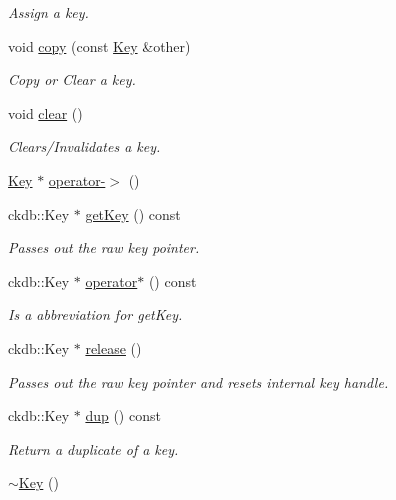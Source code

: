 \begin{DoxyCompactItemize}
\begin{DoxyCompactList}\small\item\em Assign a key. \end{DoxyCompactList}\item 
void \hyperlink{classkdb_1_1Key_ab5bc93e22f4cf40b9d2b1fc32cc260be}{copy} (const \hyperlink{classkdb_1_1Key}{Key} \&other)
\begin{DoxyCompactList}\small\item\em Copy or Clear a key. \end{DoxyCompactList}\item 
void \hyperlink{classkdb_1_1Key_a33a112681b0b2e94e6d369c0f89e361b}{clear} ()
\begin{DoxyCompactList}\small\item\em Clears/\+Invalidates a key. \end{DoxyCompactList}\item 
\hyperlink{classkdb_1_1Key}{Key} $\ast$ \hyperlink{classkdb_1_1Key_ab64ec9d578e083dad3e43322535cf108}{operator-\/$>$} ()
\item 
ckdb\+::\+Key $\ast$ \hyperlink{classkdb_1_1Key_ae81381365a7c159f070e74a7b7bd8688}{get\+Key} () const 
\begin{DoxyCompactList}\small\item\em Passes out the raw key pointer. \end{DoxyCompactList}\item 
ckdb\+::\+Key $\ast$ \hyperlink{classkdb_1_1Key_a6e0dd36c31cc7c46ee1cda0decc6e884}{operator$\ast$} () const 
\begin{DoxyCompactList}\small\item\em Is a abbreviation for get\+Key. \end{DoxyCompactList}\item 
ckdb\+::\+Key $\ast$ \hyperlink{classkdb_1_1Key_a9ae719043e6e99f5f3d6fb85837306f8}{release} ()
\begin{DoxyCompactList}\small\item\em Passes out the raw key pointer and resets internal key handle. \end{DoxyCompactList}\item 
ckdb\+::\+Key $\ast$ \hyperlink{classkdb_1_1Key_a43a1f28d7a0d40f0ded8473d480931ff}{dup} () const 
\begin{DoxyCompactList}\small\item\em Return a duplicate of a key. \end{DoxyCompactList}\item 
\hyperlink{classkdb_1_1Key_a35dd6ae58d125a298e30aed13b15c1f4}{$\sim$\+Key} ()

\end{DoxyCompactItemize}

